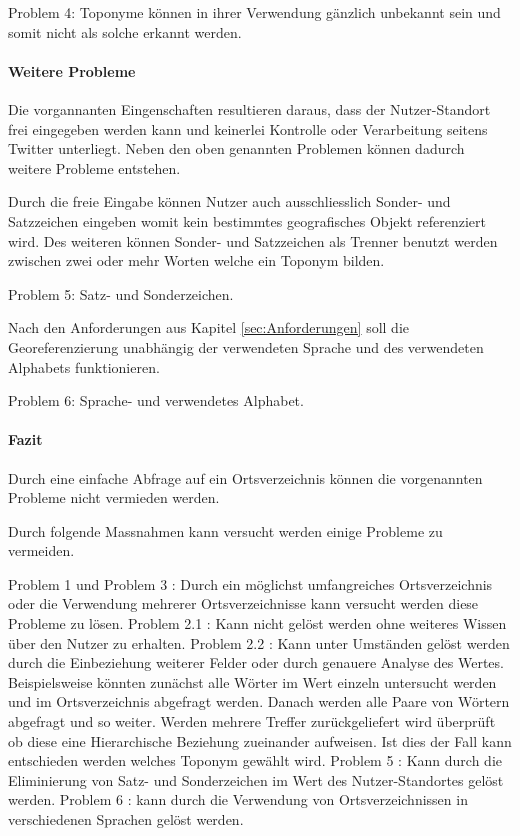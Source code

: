 				Problem 4: Toponyme können in ihrer Verwendung gänzlich unbekannt sein und somit nicht als solche erkannt werden.

			\paragraph{Weitere Probleme}

				Die vorgannanten Eingenschaften resultieren daraus, dass der Nutzer-Standort frei eingegeben werden kann und keinerlei Kontrolle oder Verarbeitung seitens Twitter unterliegt. 
				Neben den oben genannten Problemen können dadurch weitere Probleme entstehen.

				Durch die freie Eingabe können Nutzer auch ausschliesslich Sonder- und Satzzeichen eingeben womit kein bestimmtes geografisches Objekt referenziert wird. 
				Des weiteren können Sonder- und Satzzeichen als Trenner benutzt werden zwischen zwei oder mehr Worten welche ein Toponym bilden.
				
				Problem 5: Satz- und Sonderzeichen.

				Nach den Anforderungen aus Kapitel \ref{sec:Anforderungen} soll die Georeferenzierung unabhängig der verwendeten Sprache und des verwendeten Alphabets funktionieren.

				Problem 6: Sprache- und verwendetes Alphabet.

			\paragraph{Fazit} 

				Durch eine einfache Abfrage auf ein Ortsverzeichnis können die vorgenannten Probleme nicht vermieden werden. 

				Durch folgende Massnahmen kann versucht werden einige Probleme zu vermeiden. 

				Problem 1 und Problem 3 : 
				Durch ein möglichst umfangreiches Ortsverzeichnis oder die Verwendung mehrerer Ortsverzeichnisse kann versucht werden diese Probleme zu lösen.  
				Problem 2.1 : Kann nicht gelöst werden ohne weiteres Wissen über den Nutzer zu erhalten.
				Problem 2.2 : Kann unter Umständen gelöst werden durch die Einbeziehung weiterer Felder oder durch genauere Analyse des Wertes. Beispielsweise könnten zunächst alle Wörter im Wert einzeln untersucht werden und im Ortsverzeichnis abgefragt werden. Danach werden alle Paare von Wörtern abgefragt und so weiter. Werden mehrere Treffer zurückgeliefert wird überprüft ob diese eine Hierarchische Beziehung zueinander aufweisen. Ist dies der Fall kann entschieden werden welches Toponym gewählt wird.     
				Problem 5 : Kann durch die Eliminierung von Satz- und Sonderzeichen im Wert des Nutzer-Standortes gelöst werden. 
				Problem 6 : kann durch die Verwendung von Ortsverzeichnissen in verschiedenen Sprachen gelöst werden.

